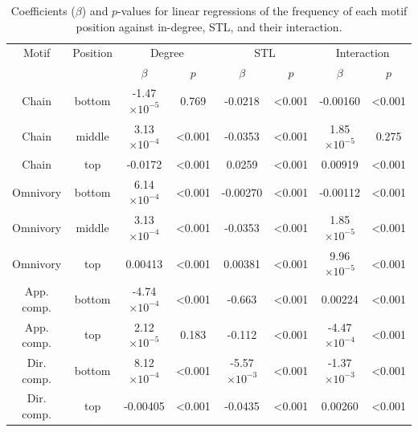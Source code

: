 \documentclass[12pt]{article}
\begin{document}
\begin{spacing}{2.0}
            \begin{table}[h!]
                \caption{Coefficients ($\beta$) and $p$-values for linear regressions of the frequency of each motif position against in-degree, STL, and their interaction.}
                \label{DT_tab}
                \footnotesize
                \begin{tabular}{c c | c c | cc | cc |}
                Motif & Position & \multicolumn{2}{c}{Degree} & \multicolumn{2}{c}{STL} & \multicolumn{2}{c}{Interaction} \\
                & & $\beta$ & $p$ & $\beta$ & $p$ & $\beta$ & $p$ \\
                \hline
                Chain & bottom & -1.47 $\times10^{-5}$ & 0.769 & -0.0218 & \textless0.001 & -0.00160 & \textless0.001 \\
                Chain & middle & 3.13$\times10^{-4}$ & \textless0.001 & -0.0353 & \textless0.001 & 1.85$\times10^{-5}$ & 0.275 \\
                Chain & top & -0.0172 & \textless0.001 & 0.0259 & \textless0.001 & 0.00919 & \textless0.001 \\
                \hline
                Omnivory & bottom & 6.14$\times10^{-4}$ & \textless0.001 & -0.00270 & \textless0.001 & -0.00112 & \textless0.001 \\
                Omnivory & middle & 3.13$\times10^{-4}$ & \textless0.001 & -0.0353 & \textless0.001 & 1.85$\times10^{-5}$ & \textless0.001 \\
                Omnivory & top & 0.00413 & \textless0.001 & 0.00381 & \textless0.001 & 9.96$\times10^{-5}$ & \textless0.001 \\
                \hline
                App. comp. & bottom & -4.74$\times10^{-4}$ & \textless0.001 & -0.663 & \textless0.001 & 0.00224 & \textless0.001 \\
                App. comp. & top & 2.12$\times10^{-5}$ & 0.183 & -0.112 & \textless0.001 & -4.47$\times10^{-4}$ & \textless0.001 \\
                \hline
                Dir. comp. & bottom & 8.12$\times10^{-4}$ & \textless0.001 & -5.57$\times10^{-3}$ & \textless0.001 & -1.37$\times10^{-3}$ & \textless0.001 \\
                Dir. comp. & top & -0.00405 & \textless0.001 & -0.0435 & \textless0.001 & 0.00260 & \textless0.001 \\
                \hline
                \end{tabular}
                \end{table}
    

\end{spacing}
\end{document}
